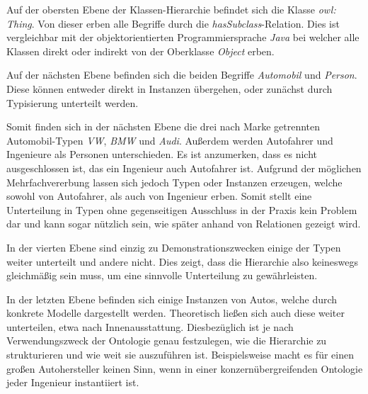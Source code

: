 \documentclass[12pt]{report}
\begin{document}
Auf der obersten Ebene der Klassen-Hierarchie befindet sich die Klasse \textit{owl: Thing}. Von dieser erben alle Begriffe durch die \textit{hasSubclass}-Relation. Dies ist vergleichbar mit der objektorientierten Programmiersprache \textit{Java} bei welcher alle Klassen direkt oder indirekt von der Oberklasse \textit{Object} erben. 

Auf der nächsten Ebene befinden sich die beiden Begriffe \textit{Automobil} und \textit{Person}. Diese können entweder direkt in Instanzen übergehen, oder zunächst durch Typisierung unterteilt werden. 

Somit finden sich in der nächsten Ebene die drei nach Marke getrennten Automobil-Typen \textit{VW}, \textit{BMW} und \textit{Audi}. Außerdem werden Autofahrer und Ingenieure als Personen unterschieden. Es ist anzumerken, dass es nicht ausgeschlossen ist, das ein Ingenieur auch Autofahrer ist. Aufgrund der möglichen Mehrfachvererbung lassen sich jedoch Typen oder Instanzen erzeugen, welche sowohl von Autofahrer, als auch von Ingenieur erben. Somit stellt eine Unterteilung in Typen ohne gegenseitigen Ausschluss in der Praxis kein Problem dar und kann sogar nützlich sein, wie später anhand von Relationen gezeigt wird. 

In der vierten Ebene sind einzig zu Demonstrationszwecken einige der Typen weiter unterteilt und andere nicht. Dies zeigt, dass die Hierarchie also keineswegs gleichmäßig sein muss, um eine sinnvolle Unterteilung zu gewährleisten. 

In der letzten Ebene befinden sich einige Instanzen von Autos, welche durch konkrete Modelle dargestellt werden. Theoretisch ließen sich auch diese weiter unterteilen, etwa nach Innenausstattung. Diesbezüglich ist je nach Verwendungszweck der Ontologie genau festzulegen, wie die Hierarchie zu strukturieren und wie weit sie auszuführen ist. Beispielsweise macht es für einen großen Autohersteller keinen Sinn, wenn in einer konzernübergreifenden Ontologie jeder Ingenieur instantiiert ist.
\end{document}
